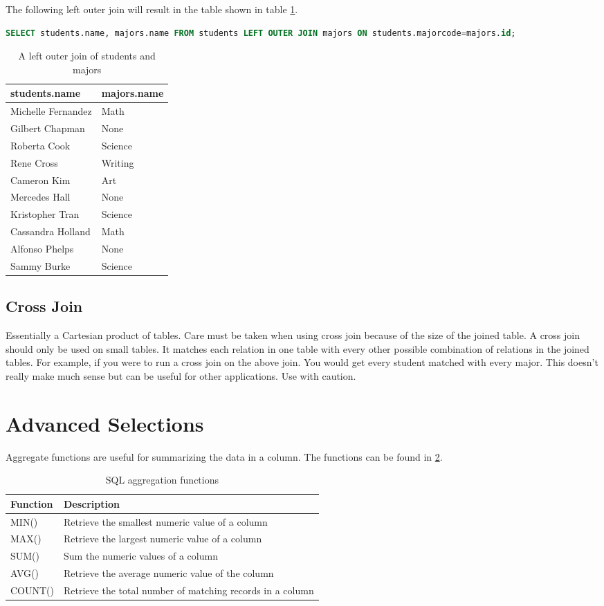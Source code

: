 The following left outer join will result in the table shown in table \ref{table:lo_studentsmajors}.
\begin{lstlisting}[language=SQL]
SELECT students.name, majors.name FROM students LEFT OUTER JOIN majors ON students.majorcode=majors.id;
\end{lstlisting}
\begin{table}
\begin{tabular}{|l|l|}
\hline
students.name & majors.name \\
\hline
Michelle Fernandez & Math \\
Gilbert Chapman & None \\
Roberta Cook & Science \\
Rene Cross & Writing \\
Cameron Kim & Art \\
Mercedes Hall & None \\
Kristopher Tran & Science \\
Cassandra Holland & Math \\
Alfonso Phelps & None \\
Sammy Burke & Science \\
\hline
\end{tabular}
\caption{A left outer join of students and majors}
\label{table:lo_studentsmajors}
\end{table}

\subsection*{Cross Join}
Essentially a Cartesian product of tables.
Care must be taken when using cross join because of the size of the joined table.
A cross join should only be used on small tables.
It matches each relation in one table with every other possible combination of relations in the joined tables.
For example, if you were to run a cross join on the above join.  You would get every student matched with every major.
This doesn't really make much sense but can be useful for other applications.
Use with caution.

\section*{Advanced Selections}
Aggregate functions are useful for summarizing the data in a column.
The functions can be found in \ref{table:aggregations}.
\begin{table}
\begin{tabular}{|l|l|}
\hline
Function & Description \\
\hline
MIN() & Retrieve the smallest numeric value of a column \\
MAX()& Retrieve the largest numeric value of a column \\
SUM() & Sum the numeric values of a column \\
AVG() & Retrieve the average numeric value of the column \\
COUNT() & Retrieve the total number of matching records in a column \\
\hline
\end{tabular}
\caption{SQL aggregation functions}
\label{table:aggregations}
\end{table}

